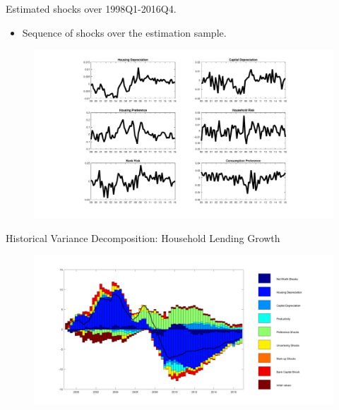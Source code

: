 \documentclass[8pt,aspectratio=169]{beamer}
\numberwithin{equation}{section}
\begin{document}
\begin{frame}{Estimated shocks over 1998Q1-2016Q4.}

\begin{itemize}
\item Sequence of shocks over the estimation sample. 

\end{itemize}
\begin{figure}[H]
\includegraphics[scale=0.3]{smoothed_shocks.pdf}
\end{figure}

\end{frame}






\begin{frame}{Historical Variance Decomposition: Household Lending Growth }


\begin{figure}
\includegraphics[scale=0.36]{decomp_dbm.pdf}
\end{figure}
\end{frame}
\end{document}
